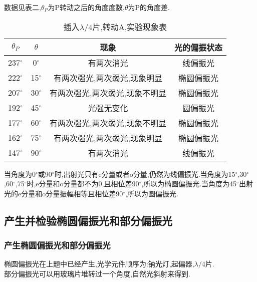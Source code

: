 \documentclass[a4paper,10pt,notitlepage]{article}
\begin{document}
	数据见表二,$\theta_P$为P转动之后的角度度数,$\theta$为P的角度差. \\
	
\begin{table}
\centering

	\begin{tabular}{|c|c|c|c|}
	\hline
	$\theta_P$ & $\theta$ & 现象 & 光的偏振状态 \\
	\hline
	237$^{\circ}$ & 0$^{\circ}$ & 有两次消光 & 线偏振光 \\
	\hline
	222$^{\circ}$ & 15$^{\circ}$ & 有两次强光,两次弱光,现象明显 & 椭圆偏振光 \\
	\hline
	207$^{\circ}$ & 30$^{\circ}$ & 有两次强光,两次弱光,现象不明显 & 椭圆偏振光 \\
	\hline
	192$^{\circ}$ & 45$^{\circ}$ & 光强无变化 & 圆偏振光 \\
	\hline
	177$^{\circ}$ & 60$^{\circ}$ & 有两次强光,两次弱光,现象不明显 & 椭圆偏振光 \\
	\hline
	162$^{\circ}$ & 75$^{\circ}$ & 有两次强光,两次弱光,现象明显 & 椭圆偏振光 \\
	\hline
	147$^{\circ}$ & 90$^{\circ}$ & 有两次消光 & 线偏振光 \\
	\hline
	
	\end{tabular}
	\caption{插入$\lambda / 4$片,转动A,实验现象表}
\end{table}

	当角度为0$^{\circ}$或90$^{\circ}$时,出射光只有e分量或者o分量,仍然为线偏振光.当角度为15$^{\circ}$,30$^{\circ}$,60$^{\circ}$,75$^{\circ}$时,e分量和o分量都不为0,且相位差90$^{\circ}$,所以为椭圆偏振光.当角度为45$^{\circ}$出射光的e分量和o分量振幅相等且相位差90$^{\circ}$,所以为圆偏振光. \\
	
\subsection{产生并检验椭圆偏振光和部分偏振光}

\subsubsection{产生椭圆偏振光和部分偏振光}

	椭圆偏振光在上题中已经产生,光学元件顺序为:钠光灯,起偏器,$\lambda / 4$片. \\
	
	部分偏振光可以用玻璃片堆转过一个角度,自然光斜射来得到. \\
	
\end{document}

